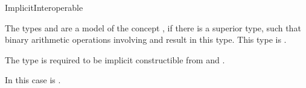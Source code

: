 \begin{ccRefConcept}{ImplicitInteroperable}
\begin{ccAdvanced}
\ccDefinition

The types  and  are a model of the concept 
, if there is a superior type, such that 
binary arithmetic operations involving  and  result in 
this type. This type is . 

The type  is required to be 
implicit constructible from  and . 


In this case  
is .


\ccRefines
 
\ccSeeAlso
{}\\
\\
\\
\\

\end{ccAdvanced}
\end{ccRefConcept}
